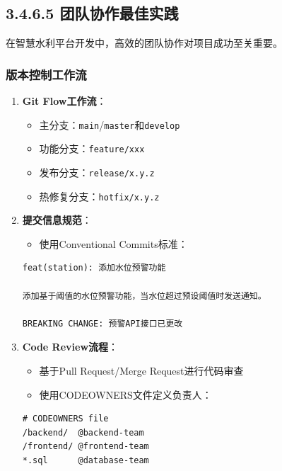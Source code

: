 \subsection{3.4.6.5
团队协作最佳实践}\label{ux56e2ux961fux534fux4f5cux6700ux4f73ux5b9eux8df5}

在智慧水利平台开发中，高效的团队协作对项目成功至关重要。

\subsubsection{版本控制工作流}\label{ux7248ux672cux63a7ux5236ux5de5ux4f5cux6d41}

\begin{enumerate}
\def\labelenumi{\arabic{enumi}.}
\tightlist
\item
  \textbf{Git Flow工作流}：

  \begin{itemize}
  \tightlist
  \item
    主分支：\passthrough{\lstinline!main!}/\passthrough{\lstinline!master!}和\passthrough{\lstinline!develop!}
  \item
    功能分支：\passthrough{\lstinline!feature/xxx!}
  \item
    发布分支：\passthrough{\lstinline!release/x.y.z!}
  \item
    热修复分支：\passthrough{\lstinline!hotfix/x.y.z!}
  \end{itemize}
\item
  \textbf{提交信息规范}：

  \begin{itemize}
  \tightlist
  \item
    使用Conventional Commits标准：
  \end{itemize}

\begin{lstlisting}
feat(station): 添加水位预警功能

添加基于阈值的水位预警功能，当水位超过预设阈值时发送通知。

BREAKING CHANGE: 预警API接口已更改
\end{lstlisting}
\item
  \textbf{Code Review流程}：

  \begin{itemize}
  \tightlist
  \item
    基于Pull Request/Merge Request进行代码审查
  \item
    使用CODEOWNERS文件定义负责人：
  \end{itemize}

\begin{lstlisting}
# CODEOWNERS file
/backend/  @backend-team
/frontend/ @frontend-team
*.sql      @database-team
\end{lstlisting}
\end{enumerate}

